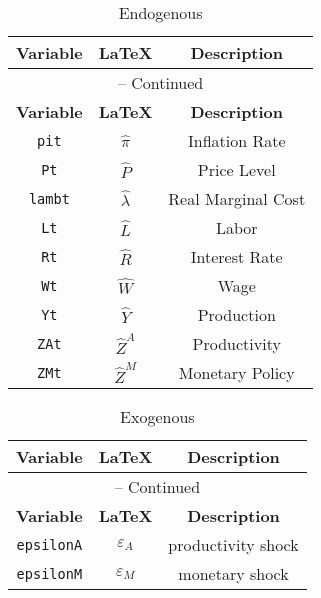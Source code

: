 \begin{center}
\begin{longtable}{ccc}
\caption{Endogenous}\\%
\hline%
\multicolumn{1}{c}{\textbf{Variable}} &
\multicolumn{1}{c}{\textbf{\LaTeX}} &
\multicolumn{1}{c}{\textbf{Description}}\\%
\hline\hline%
\endfirsthead
\multicolumn{3}{c}{{\tablename} \thetable{} -- Continued}\\%
\hline%
\multicolumn{1}{c}{\textbf{Variable}} &
\multicolumn{1}{c}{\textbf{\LaTeX}} &
\multicolumn{1}{c}{\textbf{Description}}\\%
\hline\hline%
\endhead
\texttt{pit} & ${\hat{\pi}}$ & Inflation Rate\\
\texttt{Pt} & ${\hat{P}}$ & Price Level\\
\texttt{lambt} & ${\hat{\lambda}}$ & Real Marginal Cost\\
\texttt{Lt} & ${\hat{L}}$ & Labor\\
\texttt{Rt} & ${\hat{R}}$ & Interest Rate\\
\texttt{Wt} & ${\hat{W}}$ & Wage\\
\texttt{Yt} & ${\hat{Y}}$ & Production\\
\texttt{ZAt} & ${\hat{Z}^A}$ & Productivity\\
\texttt{ZMt} & ${\hat{Z}^M}$ & Monetary Policy\\
\hline%
\end{longtable}
\end{center}
\begin{center}
\begin{longtable}{ccc}
\caption{Exogenous}\\%
\hline%
\multicolumn{1}{c}{\textbf{Variable}} &
\multicolumn{1}{c}{\textbf{\LaTeX}} &
\multicolumn{1}{c}{\textbf{Description}}\\%
\hline\hline%
\endfirsthead
\multicolumn{3}{c}{{\tablename} \thetable{} -- Continued}\\%
\hline%
\multicolumn{1}{c}{\textbf{Variable}} &
\multicolumn{1}{c}{\textbf{\LaTeX}} &
\multicolumn{1}{c}{\textbf{Description}}\\%
\hline\hline%
\endhead
\texttt{epsilonA} & ${\varepsilon_A}$ & productivity shock\\
\texttt{epsilonM} & ${\varepsilon_M}$ & monetary shock\\
\hline%
\end{longtable}
\end{center}
